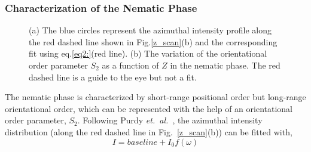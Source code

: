 \documentclass[aps,prl,preprint,superscriptaddress]{revtex4-1} %
\begin{document}
\subsubsection{Characterization of the Nematic Phase}
\begin{figure}[ht]
\caption{(a) The blue circles represent the azimuthal intensity profile along the red dashed line shown in Fig.\ref{z_scan}(b) and the corresponding fit using eq.\ref{eq2:}(red line). (b) The variation of the orientational order parameter $S_2$ as a function of $Z$ in the nematic phase. The red dashed line is a guide to the eye but not a fit.}\label{order_param}
\end{figure} 
The nematic phase is characterized by short-range positional order but long-range orientational order, which can be represented with the help of an orientational order parameter, $S_2$. Following Purdy \emph{et.~al.}~\cite{purdy2003measuring, kleshchanok2010structures}, the azimuthal intensity distribution (along the red dashed line in Fig.~\ref{z_scan}(b)) can be fitted with,
\begin{equation}
\label{eq2:}
I= baseline +  I_0 f(\omega)
\end{equation} 
\end{document}
